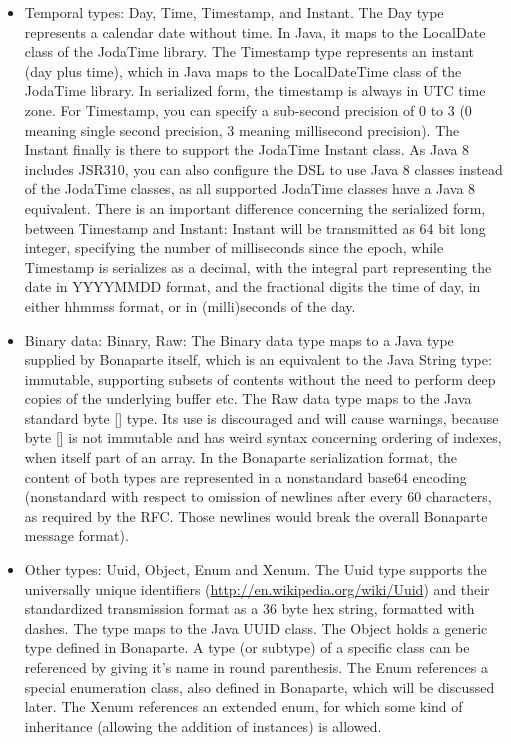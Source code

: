 \documentclass[11pt,a4paper,oneside]{article}
\begin{document}
\begin{itemize}
  \item Temporal types: {\ttfamily Day}, {\ttfamily Time}, {\ttfamily Timestamp}, and {\ttfamily Instant}. The {\ttfamily Day}
  type represents a calendar date without time. In Java, it maps to the {\ttfamily LocalDate} class of the JodaTime library. The {\ttfamily Timestamp} type represents an instant (day plus time), which in Java maps   
    to the {\ttfamily LocalDateTime} class of the JodaTime library. In serialized form, the timestamp is always in UTC time zone. For {\ttfamily Timestamp},
    you can specify a sub-second precision of 0 to 3 (0 meaning single second precision, 3 meaning millisecond precision). 
    The {\ttfamily Instant} finally is there to support the JodaTime {\ttfamily Instant} class.
    As Java 8 includes JSR310, you can also configure the DSL to use Java 8 classes instead of the JodaTime classes, as all
    supported JodaTime classes have a Java 8 equivalent. There is an important difference concerning the serialized form,
    between {\ttfamily Timestamp} and {\ttfamily Instant}: {\ttfamily Instant} will be transmitted as 64 bit long integer,
    specifying the number of milliseconds since the epoch, while {\ttfamily Timestamp} is serializes as a decimal, with the
    integral part representing the date in YYYYMMDD format, and the fractional digits the time of day, in either hhmmss
    format, or in (milli)seconds of the day.
  \item Binary data: {\ttfamily Binary}, {\ttfamily Raw}: The {\ttfamily Binary} data type maps to a Java type supplied by Bonaparte itself, which is an
    equivalent to the Java {\ttfamily String} type: immutable, supporting subsets of contents without the need to perform deep copies of the underlying buffer etc.
    The {\ttfamily Raw} data type maps to the Java standard {\ttfamily byte []} type. Its use is discouraged and will cause warnings, because
    {\ttfamily byte []} is not immutable and has weird syntax concerning ordering of indexes, when itself part of an array.
    In the Bonaparte serialization format, the content of both types are represented in a nonstandard base64 encoding (nonstandard with respect to omission of
    newlines after every 60 characters, as required by the RFC. Those newlines would break the overall Bonaparte message format).
  \item Other types: {\ttfamily Uuid}, {\ttfamily Object}, {\ttfamily Enum} and {\ttfamily Xenum}. The
  {\ttfamily Uuid} type supports the universally unique identifiers (\url{http://en.wikipedia.org/wiki/Uuid}) and their standardized transmission format as a 36 byte hex string, formatted with dashes.
   The type maps to the Java UUID class. The {\ttfamily Object} holds a generic type defined in Bonaparte. A type (or subtype) of a specific class can be
    referenced by giving it's name in round parenthesis.  
   The {\ttfamily Enum} references a special enumeration class, also defined in Bonaparte, which will be discussed later.   
   The {\ttfamily Xenum} references an extended enum, for which some kind of inheritance (allowing the addition of instances) is
   allowed.
\end{itemize}
\end{document}

